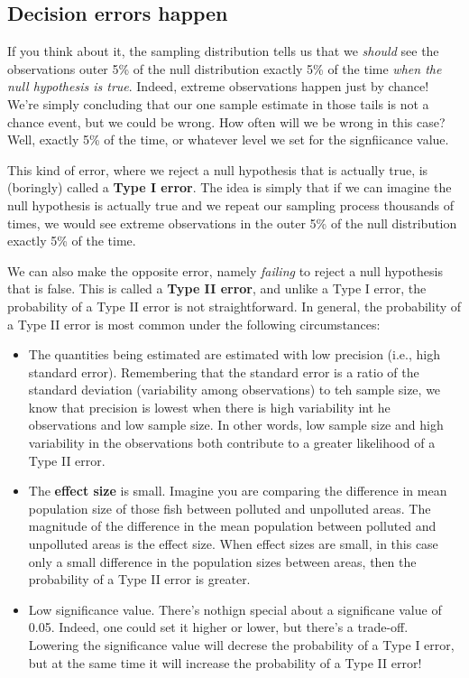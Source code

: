 \documentclass[
]{book}
\providecommand{\tightlist}{%
  \setlength{\itemsep}{0pt}\setlength{\parskip}{0pt}}
\begin{document}
\subsection{Decision errors happen}\label{decision-errors-happen}

If you think about it, the sampling distribution tells us that we \emph{should} see the observations outer 5\% of the null distribution exactly 5\% of the time \emph{when the null hypothesis is true}. Indeed, extreme observations happen just by chance! We're simply concluding that our one sample estimate in those tails is not a chance event, but we could be wrong. How often will we be wrong in this case? Well, exactly 5\% of the time, or whatever level we set for the signfiicance value.

This kind of error, where we reject a null hypothesis that is actually true, is (boringly) called a \textbf{Type I error}. The idea is simply that if we can imagine the null hypothesis is actually true and we repeat our sampling process thousands of times, we would see extreme observations in the outer 5\% of the null distribution exactly 5\% of the time.

We can also make the opposite error, namely \emph{failing} to reject a null hypothesis that is false. This is called a \textbf{Type II error}, and unlike a Type I error, the probability of a Type II error is not straightforward. In general, the probability of a Type II error is most common under the following circumstances:

\begin{itemize}
\tightlist
\item
  The quantities being estimated are estimated with low precision (i.e., high standard error). Remembering that the standard error is a ratio of the standard deviation (variability among observations) to teh sample size, we know that precision is lowest when there is high variability int he observations and low sample size. In other words, low sample size and high variability in the observations both contribute to a greater likelihood of a Type II error.
\item
  The \textbf{effect size} is small. Imagine you are comparing the difference in mean population size of those fish between polluted and unpolluted areas. The magnitude of the difference in the mean population between polluted and unpolluted areas is the effect size. When effect sizes are small, in this case only a small difference in the population sizes between areas, then the probability of a Type II error is greater.
\item
  Low significance value. There's nothign special about a significane value of 0.05. Indeed, one could set it higher or lower, but there's a trade-off. Lowering the significance value will decrese the probability of a Type I error, but at the same time it will increase the probability of a Type II error!
\end{itemize}
\end{document}
